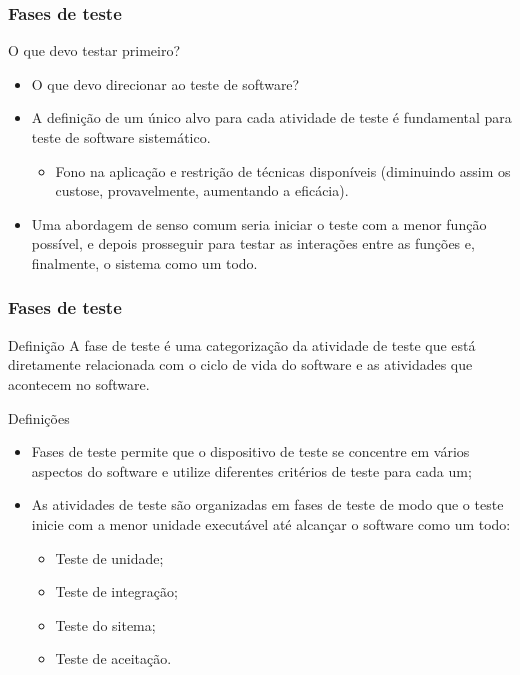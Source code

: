 \begin{frame}[parent={cmap:software-testing-foundations}, hasprev=false, hasnext=true]
\frametitle{Fases de teste}

\begin{block:fact}{O que devo testar primeiro?}
\begin{itemize}
	\item O que devo direcionar ao teste de software?

	\item A definição de um único alvo para cada atividade de teste é fundamental para teste de software sistemático.
	\begin{itemize}
		\item Fono na aplicação e restrição de técnicas disponíveis (diminuindo assim os custose, provavelmente, aumentando a eficácia).
	\end{itemize}

	\item Uma abordagem de senso comum seria iniciar o teste com a menor função possível, e depois prosseguir para testar as interações entre as funções e, finalmente, o sistema como um todo.
\end{itemize}
\end{block:fact}
\end{frame}


\begin{frame}[hasprev=true, hasnext=true]
\frametitle{Fases de teste}
\label{concept:test-phase}
\label{concept:phase}

\begin{block:concept}{Definição}
A fase de teste é uma categorização da atividade de teste que está diretamente relacionada com o ciclo de vida do software e as atividades que acontecem no software.
\end{block:concept}

\begin{block:fact}{Definições}
\begin{itemize}
	\item Fases de teste permite que o dispositivo de teste se concentre em vários aspectos do software e utilize diferentes critérios de teste para cada um;

	\item As atividades de teste são organizadas em fases de teste de modo que o teste inicie com a menor unidade executável até alcançar o software como um todo:
	\begin{itemize}
		\item Teste de unidade;
		\item Teste de integração;
		\item Teste do sitema;
		\item Teste de aceitação.
	\end{itemize}
\end{itemize}
\end{block:fact}
\end{frame}


